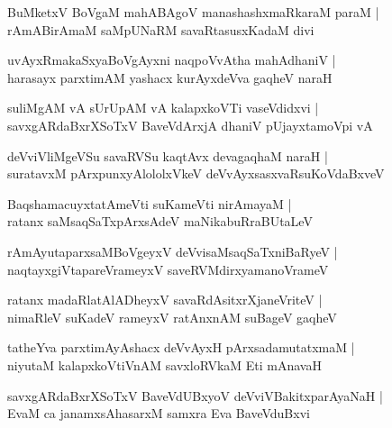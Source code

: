 \documentclass[twoside,12pt,openright]{book}
\newcounter{shloka}[chapter]
\begin{document}
\begin{shloka}%
BuMketxV BoVgaM mahABAgoV manashashxmaRkaraM paraM |\\
rAmABirAmaM saMpUNaRM savaRtasusxKadaM divi
\end{shloka}

\begin{shloka}%
uvAyxRmakaSxyaBoVgAyxni naqpoVvAtha mahAdhaniV |\\
harasayx parxtimAM yashacx kurAyxdeVva gaqheV naraH
\end{shloka}

\begin{shloka}%
suliMgAM vA sUrUpAM vA kalapxkoVTi vaseVdidxvi |\\
savxgARdaBxrXSoTxV BaveVdArxjA dhaniV pUjayxtamoVpi vA 
\end{shloka}

\begin{shloka}%
deVviVliMgeVSu savaRVSu kaqtAvx devagaqhaM naraH |\\
suratavxM pArxpunxyAlololxVkeV deVvAyxsasxvaRsuKoVdaBxveV 
\end{shloka}

\begin{shloka}%
BaqshamacuyxtatAmeVti suKameVti nirAmayaM |\\
ratanx saMsaqSaTxpArxsAdeV maNikabuRraBUtaLeV 
\end{shloka}

\begin{shloka}%
rAmAyutaparxsaMBoVgeyxV deVvisaMsaqSaTxniBaRyeV |\\
naqtayxgiVtapareVrameyxV saveRVMdirxyamanoVrameV 
\end{shloka}

\begin{shloka}%
ratanx madaRlatAlADheyxV savaRdAsitxrXjaneVriteV |\\
nimaRleV suKadeV rameyxV ratAnxnAM suBageV gaqheV 
\end{shloka}

\begin{shloka}%
tatheYva parxtimAyAshacx deVvAyxH pArxsadamutatxmaM |\\
niyutaM kalapxkoVtiVnAM savxloRVkaM Eti mAnavaH 
\end{shloka}

\begin{shloka}%
savxgARdaBxrXSoTxV BaveVdUBxyoV deVviVBakitxparAyaNaH |\\
EvaM ca janamxsAhasarxM samxra Eva BaveVduBxvi
\end{shloka}
\end{document}
